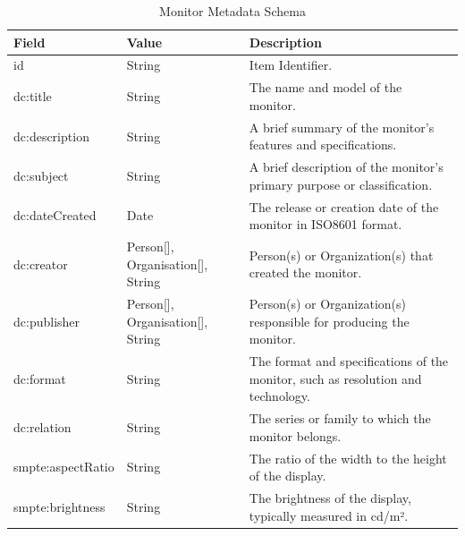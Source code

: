 \begin{longtable}{|p{}|p{}|p{}|}
    \caption{Monitor Metadata Schema} \label{tab:c4-monitor} \\
    \hline
    \textbf{Field} & \textbf{Value} & \textbf{Description} \\
    \hline

    \scriptsize id                      & \scriptsize String           & \scriptsize Item Identifier. \\
    \hline
    dc:title                & \scriptsize String           & \scriptsize The name and model of the monitor. \\
    \hline
    \scriptsize dc:description          & \scriptsize String           & \scriptsize A brief summary of the monitor's features and specifications. \\
    \hline
    \scriptsize dc:subject              & \scriptsize String           & \scriptsize A brief description of the monitor's primary purpose or classification. \\
    \hline
    \scriptsize dc:dateCreated          & \scriptsize Date             & \scriptsize The release or creation date of the monitor in ISO8601 format. \\
    \hline
    \scriptsize dc:creator              & \scriptsize \scriptsize \textcolor{uniudColor3}{Person}[], \textcolor{uniudColor3}{Organisation}[], String           & \scriptsize Person(s) or Organization(s) that created the monitor. \\
    \hline
    \scriptsize dc:publisher            & \scriptsize \scriptsize \textcolor{uniudColor3}{Person}[], \textcolor{uniudColor3}{Organisation}[], String           & \scriptsize Person(s) or Organization(s) responsible for producing the monitor. \\
    \hline
    \scriptsize dc:format               & \scriptsize String           & \scriptsize The format and specifications of the monitor, such as resolution and technology. \\
    \hline
    \scriptsize dc:relation             & \scriptsize String           & \scriptsize The series or family to which the monitor belongs. \\
    \hline
    \scriptsize smpte:aspectRatio      & \scriptsize String           & \scriptsize The ratio of the width to the height of the display. \\
    \hline
    \scriptsize smpte:brightness        & \scriptsize String           & \scriptsize The brightness of the display, typically measured in cd/m². \\

\end{longtable}

